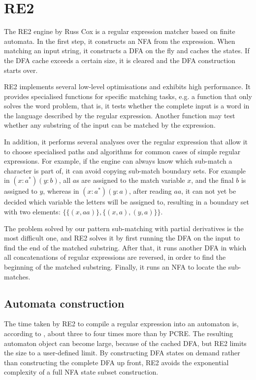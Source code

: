 \section{RE2}

The RE2 engine by Russ Cox is a regular expression matcher based on finite
automata. In the first step, it constructs an NFA from the expression. When
matching an input string, it constructs a DFA on the fly and caches the states.
If the DFA cache exceeds a certain size, it is cleared and the DFA construction
starts over.

RE2 implements several low-level optimisations and exhibits high performance. It
provides specialised functions for specific matching tasks, e.g. a function that
only solves the word problem, that is, it tests whether the complete input is a
word in the language described by the regular expression. Another function may
test whether any substring of the input can be matched by the expression.

In addition, it performs several analyses over the regular expression that allow
it to choose specialised paths and algorithms for common cases of simple regular
expressions. For example, if the engine can always know which sub-match a
character is part of, it can avoid copying sub-match boundary sets. For example
in $(x:a^*)(y:b)$, all $a$s are assigned to the match variable $x$, and the
final $b$ is assigned to $y$, whereas in $(x:a^*)(y:a)$, after reading $aa$, it
can not yet be decided which variable the letters will be assigned to, resulting
in a boundary set with two elements: $\{\{(x,aa)\},\{(x,a),(y,a)\}\}$.

The problem solved by our pattern sub-matching with partial derivatives is the
most difficult one, and RE2 solves it by first running the DFA on the input to
find the end of the matched substring. After that, it runs another DFA in which
all concatenations of regular expressions are reversed, in order to find the
beginning of the matched substring. Finally, it runs an NFA to locate the
sub-matches.


\subsection{Automata construction}

The time taken by RE2 to compile a regular expression into an automaton is,
according to \cite{regexp3}, about three to four times more than by PCRE. The
resulting automaton object can become large, because of the cached DFA, but RE2
limits the size to a user-defined limit. By constructing DFA states on demand
rather than constructing the complete DFA up front, RE2 avoids the exponential
complexity of a full NFA state subset construction.


